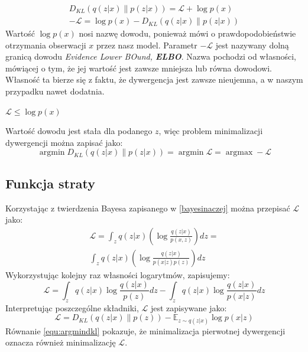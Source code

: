 \documentclass[a4paper,12pt,oneside]{book} %
\begin{document}
\begin{equation}\label{elbo}
	\begin{array}{rcl}
		D_{KL}(q(z|x)\|p(z|x))= \mathcal{L} + \log p(x)\\[1ex]
	-\mathcal{L} = \log p(x) - D_{KL}(q(z|x)\|p(z|x))
	\end{array}
\end{equation}
Wartość $\log p(x)$ nosi nazwę dowodu, ponieważ mówi o prawdopodobieństwie otrzymania obserwacji $x$ przez nasz model.
Parametr $-\mathcal{L}$ jest nazywany dolną granicą dowodu \textit{Evidence Lower BOund, \textbf{ELBO}}. Nazwa pochodzi od własności, mówiącej o tym, że jej wartość jest zawsze mniejsza lub równa dowodowi. Własność ta bierze się z faktu, że dywergencja jest zawsze nieujemna, a w naszym przypadku nawet dodatnia. 
\begin{center}
	$\mathcal{L}\leq\log p(x)$
\end{center}
Wartość dowodu jest stała dla podanego $z$, więc problem minimalizacji dywergencji można zapisać jako:
\begin{equation}
	\operatorname*{argmin}D_{KL}(q(z|x)\|p(z|x)) = \operatorname*{argmin}\mathcal{L} = \operatorname*{argmax}-\mathcal{L}
	\label{equ:argmindkl}
\end{equation}
\subsection{Funkcja straty}
Korzystając z twierdzenia Bayesa zapisanego w \ref{bayesinaczej} można przepisać $\mathcal{L}$ jako:
\begin{equation}
	\begin{aligned}
		\mathcal{L}=\displaystyle\int_{z}^{}q(z|x)\left( \log\frac{q(z|x)}{p(x,z)}\right)dz=\\[1ex]
		\displaystyle\int_{z}^{}q(z|x)\left( \log\frac{q(z|x)}{p(x|z)p(z)}\right)dz
		\label{equ:kldlogagn}
	\end{aligned}
\end{equation}
Wykorzystując kolejny raz własności logarytmów, zapisujemy:
\begin{equation}
	\mathcal{L}=\displaystyle\int_{z}^{}q(z|x)\log\frac{q(z|x)}{p(z)}dz - \displaystyle\int_{z}^{}q(z|x)\log\frac{q(z|x)}{p(x|z)}dz
	\label{equ:elbolog}
\end{equation}
Interpretując poszczególne składniki, $\mathcal{L}$ jest zapisywane jako:
\begin{equation}
	\mathcal{L} =  D_{KL}(q(z|x)\|p(z)) - \mathbb{E}_{z\sim q(z|x)}\log p(x|z)
	\label{equ:ostatniejuz}
\end{equation}
Równanie \ref{equ:argmindkl} pokazuje, że minimalizacja pierwotnej dywergencji oznacza również minimalizację $\mathcal{L}$. 
\end{document}
